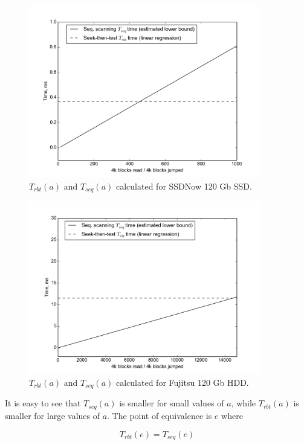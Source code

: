 \documentclass[final,5p,times,twocolumn,authoryear]{elsarticle}
\begin{document}
\begin{figure}
  \centerline{\includegraphics[width=0.9\textwidth]{processing-time-ssd}}
  \caption{$T_{rbt}(a)$ and $T_{seq}(a)$ calculated for SSDNow 120 Gb SSD.}
  \label{fig:processing_time_ssd}
\end{figure}

\begin{figure}
  \centerline{\includegraphics[width=0.9\textwidth]{processing-time-hdd}}
  \caption{$T_{rbt}(a)$ and $T_{seq}(a)$ calculated for Fujitsu 120 Gb HDD.}
  \label{fig:processing_time_hdd}
\end{figure}

It is easy to see that $T_{seq}(a)$ is smaller for small values of $a$, while $T_{rbt}(a)$ is smaller for large values of $a$. The point of equivalence is $e$ where

\begin{equation}
  T_{rbt}(e)=T_{seq}(e)
\end{equation}
\end{document}
